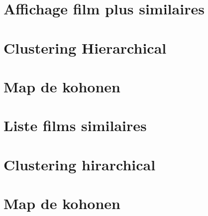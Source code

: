 	\section{Affichage film plus similaires}
	\section{Clustering Hierarchical}
	\section{Map de kohonen}
	
	\section{Liste films similaires}
	\section{Clustering hirarchical}
	\section{Map de kohonen}

 
 
 
 

